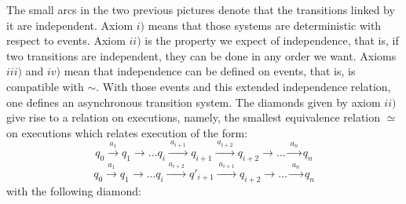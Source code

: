 	The small arcs in the two previous pictures denote that the transitions linked by it are independent. Axiom $i)$ means that those systems are deterministic with respect to events. Axiom $ii)$ is the property we expect of independence, that is, if two transitions are independent, they can be done in any order we want. Axioms $iii)$ and $iv)$ mean that independence can be defined on events, that is, is compatible with $\sim$. With those events and this extended independence relation, one defines an asynchronous transition system. The diamonds given by axiom $ii)$ give rise to a relation on executions, namely, the smallest equivalence relation $\simeq$ on executions which relates execution of the form:
	 $$q_0 \xrightarrow{~a_1~} q_1 \xrightarrow{~~~~} \ldots q_i \xrightarrow{~a_{i+1}~} q_{i+1}  \xrightarrow{~a_{i+2}~} q_{i+2} \xrightarrow{~~~~} \ldots \xrightarrow{~a_n~} q_n$$
	 $$q_0 \xrightarrow{~a_1~} q_1 \xrightarrow{~~~~} \ldots q_i \xrightarrow{~a_{i+2}~} q'_{i+1}  \xrightarrow{~a_{i+1}~} q_{i+2} \xrightarrow{~~~~} \ldots \xrightarrow{~a_n~} q_n$$
\noindent with the following diamond:
				\begin{figure}[H]
					\begin{center}
    						
  					\end{center}
				\end{figure}
%	
%
%
